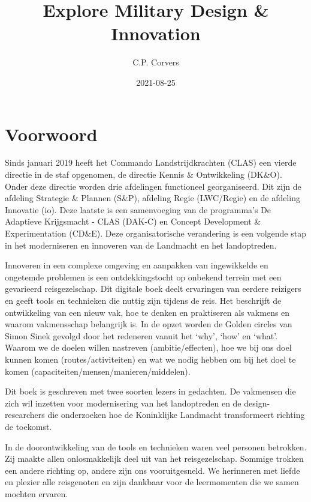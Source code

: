 \documentclass[
]{book}
\title{Explore Military Design \& Innovation}
\author{C.P. Corvers}
\date{2021-08-25}
\begin{document}
\maketitle

{
\setcounter{tocdepth}{1}
\tableofcontents
}
\hypertarget{voorwoord}{%
\chapter*{Voorwoord}\label{voorwoord}}

Sinds januari 2019 heeft het Commando Landstrijdkrachten (CLAS) een vierde directie in de staf opgenomen, de directie Kennis \& Ontwikkeling (DK\&O). Onder deze directie worden drie afdelingen functioneel georganiseerd. Dit zijn de afdeling Strategie \& Plannen (S\&P), afdeling Regie (LWC/Regie) en de afdeling Innovatie (io). Deze laatste is een samenvoeging van de programma's De Adaptieve Krijgsmacht - CLAS (DAK-C) en Concept Development \& Experimentation (CD\&E). Deze organisatorische verandering is een volgende stap in het moderniseren en innoveren van de Landmacht en het landoptreden.

Innoveren in een complexe omgeving en aanpakken van ingewikkelde en ongetemde problemen is een ontdekkingstocht op onbekend terrein met een gevarieerd reisgezelschap. Dit digitale boek deelt ervaringen van eerdere reizigers en geeft tools en technieken die nuttig zijn tijdens de reis. Het beschrijft de ontwikkeling van een nieuw vak, hoe te denken en praktiseren als vakmens en waarom vakmensschap belangrijk is. In de opzet worden de Golden circles van Simon Sinek gevolgd door het redeneren vanuit het `why', `how' en `what'. Waarom we de doelen willen nastreven (ambitie/effecten), hoe we bij ons doel kunnen komen (routes/activiteiten) en wat we nodig hebben om bij het doel te komen (capaciteiten/mensen/manieren/middelen).

Dit boek is geschreven met twee soorten lezers in gedachten. De vakmensen die zich wil inzetten voor modernisering van het landoptreden en de design-researchers die onderzoeken hoe de Koninklijke Landmacht transformeert richting de toekomst.

In de doorontwikkeling van de tools en technieken waren veel personen betrokken. Zij maakte allen onlosmakkelijk deel uit van het reisgezelschap. Sommige trokken een andere richting op, andere zijn ons vooruitgesneld. We herinneren met liefde en plezier alle reisgenoten en zijn dankbaar voor de leermomenten die we samen mochten ervaren.
\end{document}
